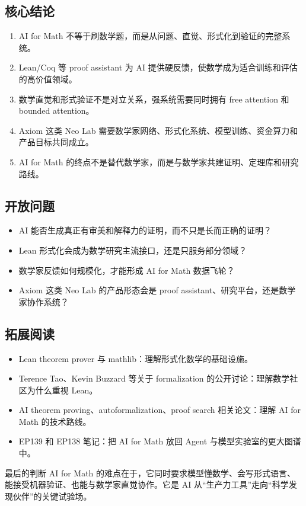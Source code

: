 \documentclass[a4paper]{article}
\begin{document}
\subsection{核心结论}

\begin{enumerate}
\item AI for Math 不等于刷数学题，而是从问题、直觉、形式化到验证的完整系统。
\item Lean/Coq 等 proof assistant 为 AI 提供硬反馈，使数学成为适合训练和评估的高价值领域。
\item 数学直觉和形式验证不是对立关系，强系统需要同时拥有 free attention 和 bounded attention。
\item Axiom 这类 Neo Lab 需要数学家网络、形式化系统、模型训练、资金算力和产品目标共同成立。
\item AI for Math 的终点不是替代数学家，而是与数学家共建证明、定理库和研究路线。
\end{enumerate}

\subsection{开放问题}

\begin{itemize}
\item AI 能否生成真正有审美和解释力的证明，而不只是长而正确的证明？
\item Lean 形式化会成为数学研究主流接口，还是只服务部分领域？
\item 数学家反馈如何规模化，才能形成 AI for Math 数据飞轮？
\item Axiom 这类 Neo Lab 的产品形态会是 proof assistant、研究平台，还是数学家协作系统？
\end{itemize}

\subsection{拓展阅读}

\begin{itemize}
\item Lean theorem prover 与 mathlib：理解形式化数学的基础设施。
\item Terence Tao、Kevin Buzzard 等关于 formalization 的公开讨论：理解数学社区为什么重视 Lean。
\item AI theorem proving、autoformalization、proof search 相关论文：理解 AI for Math 的技术路线。
\item EP139 和 EP138 笔记：把 AI for Math 放回 Agent 与模型实验室的更大图谱中。
\end{itemize}

\begin{importantbox}{最后的判断}
AI for Math 的难点在于，它同时要求模型懂数学、会写形式语言、能接受机器验证、也能与数学家直觉协作。它是 AI 从“生产力工具”走向“科学发现伙伴”的关键试验场。
\end{importantbox}
\end{document}
